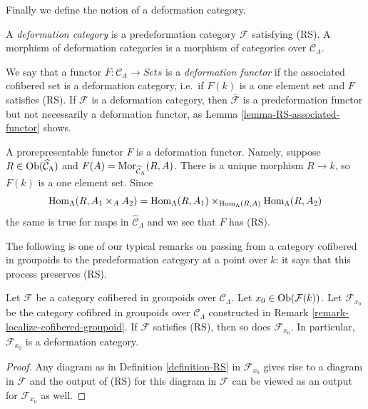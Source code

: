 \noindent
Finally we define the notion of a deformation category.

\begin{definition}
\label{definition-deformation-category}
A {\it deformation category} is a predeformation category $\mathcal{F}$
satisfying (RS). A morphism of deformation categories is a morphism of
categories over $\mathcal{C}_\Lambda$.
\end{definition}

\begin{remark}
\label{remark-deformation-functor}
We say that a functor $F: \mathcal{C}_\Lambda \to \textit{Sets}$
is a {\it deformation functor} if the associated cofibered set is a
deformation category, i.e.\ if $F(k)$ is a one element set and $F$ satisfies
(RS). If $\mathcal{F}$ is a deformation category, then
$\overline{\mathcal{F}}$
is a predeformation functor but not necessarily a deformation functor, as
Lemma \ref{lemma-RS-associated-functor} shows.
\end{remark}

\begin{example}
\label{example-prorepresentable-deformation-functor}
A prorepresentable functor $F$ is a deformation functor. Namely, suppose
$R \in \mathop{\mathrm{Ob}}\nolimits(\widehat{\mathcal{C}}_\Lambda)$ and
$F(A) = \mathop{\mathrm{Mor}}\nolimits_{\widehat{\mathcal{C}}_\Lambda}(R, A)$.
There is a unique morphism $R \to k$, so $F(k)$ is a one element set.
Since
$$
\mathop{\mathrm{Hom}}\nolimits_\Lambda(R, A_1 \times_A A_2) =
\mathop{\mathrm{Hom}}\nolimits_\Lambda(R, A_1) \times_{\mathop{\mathrm{Hom}}\nolimits_\Lambda(R, A)}
\mathop{\mathrm{Hom}}\nolimits_\Lambda(R, A_2)
$$
the same is true for maps in $\widehat{\mathcal{C}}_\Lambda$ and
we see that $F$ has (RS).
\end{example}

\noindent
The following is one of our typical remarks on passing from a category
cofibered in groupoids to the predeformation category at a point over $k$: it
says that this process preserves (RS).

\begin{lemma}
\label{lemma-localize-RS}
Let $\mathcal{F}$ be a category cofibered in groupoids over
$\mathcal{C}_\Lambda$. Let $x_0 \in \mathop{\mathrm{Ob}}\nolimits(\mathcal{F}(k))$.
Let $\mathcal{F}_{x_0}$ be the category cofibred in groupoids over
$\mathcal{C}_\Lambda$ constructed in
Remark \ref{remark-localize-cofibered-groupoid}.
If $\mathcal{F}$ satisfies (RS), then so does $\mathcal{F}_{x_0}$.
In particular, $\mathcal{F}_{x_0}$ is a deformation category.
\end{lemma}

\begin{proof}
Any diagram as in
Definition \ref{definition-RS}
in $\mathcal{F}_{x_0}$ gives rise to a diagram in $\mathcal{F}$
and the output of (RS) for this diagram in $\mathcal{F}$
can be viewed as an output for $\mathcal{F}_{x_0}$ as well.
\end{proof}

